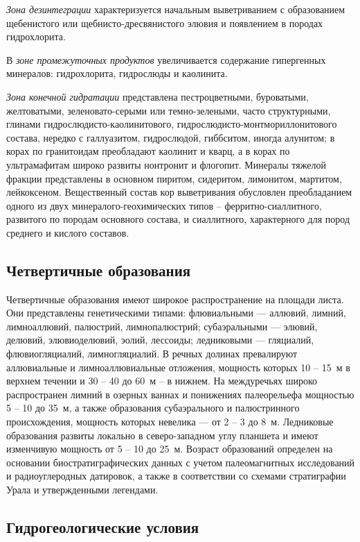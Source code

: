 \textit{Зона дезинтеграции} характеризуется начальным выветриванием с образованием щебенистого или щебнисто-дресвянистого элювия и появлением в породах гидрохлорита. 

В \textit{зоне промежуточных продуктов} увеличивается содержание гипергенных минералов: гидрохлорита, гидрослюды и каолинита. 

\textit{Зона конечной гидратации} представлена пестроцветными, буроватыми, желтоватыми, зеленовато-серыми или темно-зелеными, часто структурными, глинами гидро\-слюдисто-каолинитового, гидрослюдисто-монтмориллонитового состава, нередко с галлуазитом, гидрослюдой, гиббситом, иногда алунитом; в корах по гранитоидам преобладают каолинит и кварц, а в корах по ультрамафитам широко развиты нонтронит и флогопит. Минералы тяжелой фракции представлены в основном пиритом, сидеритом, лимонитом, мартитом, лейкоксеном. Вещественный состав кор выветривания обусловлен преобладанием одного из двух минералого-геохимических типов  --  ферритно-сиаллитного, развитого по породам основного состава, и сиаллитного, характерного для пород среднего и кислого составов.

\subsection*{Четвертичные образования}
Четвертичные образования имеют широкое распространение на площади листа. Они представлены генетическими типами: флювиальными --- аллювий, лимний, лимноаллювий, палюстрий, лимнопалюстрий; субаэральными --- элювий, делювий, элювиоделювий, эолий, лессоиды; ледниковыми --- гляциалий, флювиогляциалий, лимногляциалий. В речных долинах превалируют аллювиальные и лимноаллювиальные отложения, мощность которых 10 -- 15~м в верхнем течении и 30 -- 40 до 60~м -- в нижнем. На междуречьях широко распространен лимний в озерных ваннах и понижениях палеорельефа мощностью 5 -- 10 до 35~м, а также образования субаэрального и палюстринного происхождения, мощность которых невелика --- 
от 2 -- 3 до 8~м. Ледниковые образования развиты локально в северо-западном углу планшета и имеют изменчивую мощность от 5 -- 10 до 25~м.
Возраст образований определен на основании биостратиграфических данных с учетом палеомагнитных исследований и радиоуглеродных датировок, а также в соответствии со схемами стратиграфии Урала и утвержденными легендами.

\subsection*{Гидрогеологические условия}
%
\hydrogeology

